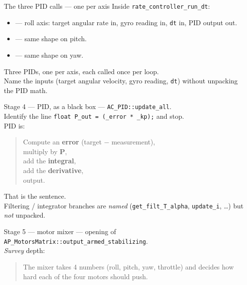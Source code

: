 \documentclass[aspectratio=169,11pt]{beamer}
\begin{document}
\begin{frame}{The three PID calls --- one per axis}
  Inside \texttt{rate\_controller\_run\_dt}:
  \begin{itemize}
    \item {} --- roll axis: target angular rate in, gyro reading in, \texttt{dt} in, PID output out.
    \item {} --- same shape on pitch.
    \item {} --- same shape on yaw.
  \end{itemize}
  Three PIDs, one per axis, each called once per loop.\\[1ex]
  Name the inputs (target angular velocity, gyro reading, \texttt{dt}) without unpacking the PID math.
\end{frame}

\begin{frame}{Stage 4 --- PID, as a black box}
   --- \texttt{AC\_PID::update\_all}.\\[1ex]
  Identify the line \texttt{float P\_out = (\_error * \_kp);} and stop.\\[1ex]
  PID is:
  \begin{quote}
    Compute an \textbf{error} (target $-$ measurement),\\
    multiply by \textbf{P},\\
    add the \textbf{integral},\\
    add the \textbf{derivative},\\
    output.
  \end{quote}
  That is the sentence.\\[1ex]
  Filtering / integrator branches are \emph{named} (\texttt{get\_filt\_T\_alpha}, \texttt{update\_i}, \dots) but \emph{not} unpacked.
\end{frame}

\begin{frame}{Stage 5 --- motor mixer}
   --- opening of \texttt{AP\_MotorsMatrix::output\_armed\_stabilizing}.\\[1ex]
  \emph{Survey} depth:
  \begin{quote}
    The mixer takes 4 numbers (roll, pitch, yaw, throttle) and decides how hard each of the four motors should push.
  \end{quote}
\end{frame}
\end{document}
